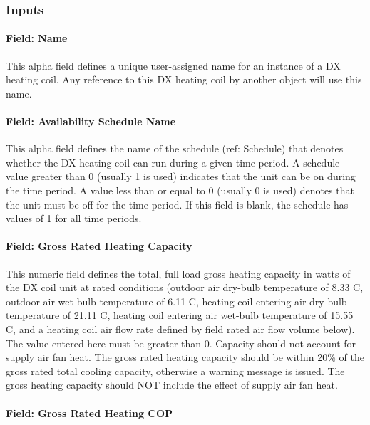 \subsubsection{Inputs}\label{inputs-19-001}

\paragraph{Field: Name}\label{field-name-18-001}

This alpha field defines a unique user-assigned name for an instance of a DX heating coil. Any reference to this DX heating coil by another object will use this name.

\paragraph{Field: Availability Schedule Name}\label{field-availability-schedule-name-10-000}

This alpha field defines the name of the schedule (ref: Schedule) that denotes whether the DX heating coil can run during a given time period. A schedule value greater than 0 (usually 1 is used) indicates that the unit can be on during the time period. A value less than or equal to 0 (usually 0 is used) denotes that the unit must be off for the time period. If this field is blank, the schedule has values of 1 for all time periods.

\paragraph{Field: Gross Rated Heating Capacity}\label{field-gross-rated-heating-capacity-2}

This numeric field defines the total, full load gross heating capacity in watts of the DX coil unit at rated conditions (outdoor air dry-bulb temperature of 8.33 C, outdoor air wet-bulb temperature of 6.11 C, heating coil entering air dry-bulb temperature of 21.11 C, heating coil entering air wet-bulb temperature of 15.55 C, and a heating coil air flow rate defined by field rated air flow volume below). The value entered here must be greater than 0. Capacity should not account for supply air fan heat. The gross rated heating capacity should be within 20\% of the gross rated total cooling capacity, otherwise a warning message is issued. The gross heating capacity should NOT include the effect of supply air fan heat.

\paragraph{Field: Gross Rated Heating COP}\label{field-gross-rated-heating-cop}

